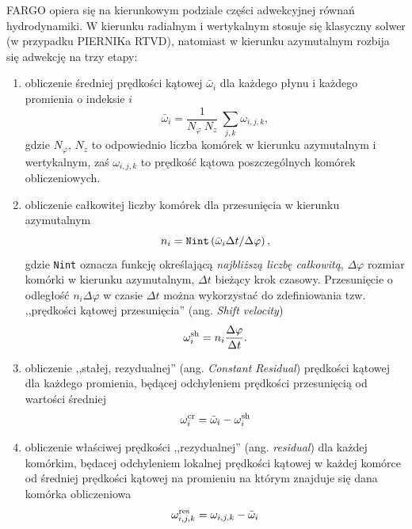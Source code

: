 \par FARGO opiera się na kierunkowym podziale części adwekcyjnej równań
hydrodynamiki. W kierunku radialnym i wertykalnym stosuje się klasyczny solwer
(w przypadku PIERNIKa RTVD), natomiast w kierunku azymutalnym rozbija się
adwekcję na trzy etapy:
\begin{enumerate}
   \item obliczenie średniej prędkości kątowej $\bar{\omega}_i$ dla każdego
      płynu i każdego promienia o indeksie $i$
      \begin{equation}
         \bar{\omega}_i = \frac{1}{N_\varphi~N_z} ~ \sum_{j,k} \omega_{i,j,k},
      \end{equation}
      gdzie $N_\varphi,\,N_z$ to odpowiednio liczba komórek w kierunku
      azymutalnym i wertykalnym, zaś $\omega_{i,j,k}$ to prędkość kątowa
      poszczególnych komórek obliczeniowych.
   \item  obliczenie całkowitej liczby komórek dla przesunięcia w kierunku
      azymutalnym
      \begin{equation}
         n_i = {\tt Nint} \left( \bar{\omega}_i \Delta t/\Delta \varphi \right),
      \end{equation}
      gdzie {\tt Nint} oznacza funkcję określającą \emph{najbliższą liczbę
      całkowitą}, $\Delta\varphi$ rozmiar komórki w kierunku azymutalnym,
      $\Delta t$ bieżący krok czasowy. Przesunięcie o odległość $n_i \Delta
      \varphi$ w czasie $\Delta t$ można wykorzystać do
      zdefiniowania tzw. ,,prędkości kątowej przesunięcia'' (ang. \emph{Shift
      velocity})
      \begin{equation}
         \omega_i^{\rm sh} = n_i \frac{\Delta \varphi}{\Delta t}.
      \end{equation}
   \item obliczenie ,,stałej, rezydualnej'' (ang. \emph{Constant Residual})
      prędkości kątowej  dla każdego promienia, będącej odchyleniem prędkości
      przesunięcią od wartości średniej
      \begin{equation}
         \omega_i^{\rm cr}= \bar{\omega}_i - \omega_i^{\rm sh}
      \end{equation}
   \item obliczenie właściwej prędkości ,,rezydualnej'' (ang. \emph{residual})
      dla każdej komórkim, będacej odchyleniem lokalnej prędkości kątowej w
      każdej komórce od średniej prędkości kątowej na promieniu na którym
      znajduje się dana komórka obliczeniowa 
      \begin{equation}
         \omega_{i,j,k}^{\rm res} = \omega_{i,j,k} - \bar{\omega}_i
      \end{equation}
\end{enumerate}

